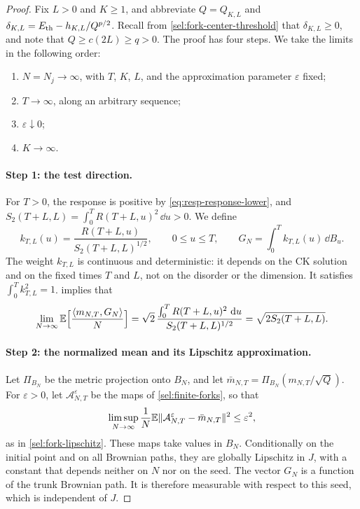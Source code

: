 \begin{proof}
Fix $L>0$ and $K\ge1$, and abbreviate $Q=Q_{K,L}$ and $\delta_{K,L}=E_{\mathrm{th}}-h_{K,L}/Q^{p/2}$. Recall from \eqref{sel:fork-center-threshold} that $\delta_{K,L}\ge0$, and note that $Q\ge c(2L)\ge q>0$. The proof has four steps. We take the limits in the following order:
\begin{enumerate}[label=(\roman*)]
\item $N=N_j\to\infty$, with $T$, $K$, $L$, and the approximation parameter $\varepsilon$ fixed;
\item $T\to\infty$, along an arbitrary sequence;
\item $\varepsilon\downarrow0$;
\item $K\to\infty$.
\end{enumerate}

\paragraph{Step 1: the test direction.}
For $T>0$, the response is positive by \eqref{eq:resp-response-lower}, and $S_2(T+L,L)=\int_0^TR(T+L,u)^2\,\dd u>0$. We define
\[
 k_{T,L}(u)=\frac{R(T+L,u)}{S_2(T+L,L)^{1/2}},\qquad 0\le u\le T,
 \qquad G_N=\int_0^Tk_{T,L}(u)\,\dd B_u.
\]
The weight $k_{T,L}$ is continuous and deterministic: it depends on the CK solution and on the fixed times $T$ and $L$, not on the disorder or the dimension. It satisfies $\int_0^Tk_{T,L}^2=1$.  implies that
\begin{equation}\label{eq:resp-test-overlap}
 \lim_{N\to\infty}\mathbb E\Bigl[\frac{\left\langle m_{N,T},G_N\right\rangle}N\Bigr]
 =\sqrt2\,\frac{\int_0^TR(T+L,u)^2\,\mathop{}\!\mathrm d u}{S_2(T+L,L)^{1/2}}
 =\sqrt{2S_2(T+L,L)}.
\end{equation}

\paragraph{Step 2: the normalized mean and its Lipschitz approximation.}
Let $\Pi_{B_N}$ be the metric projection onto $B_N$, and let $\bar m_{N,T}=\Pi_{B_N}(m_{N,T}/\sqrt Q)$. For $\varepsilon>0$, let $\mathcal A^\varepsilon_{N,T}$ be the maps of \cref{sel:finite-forks}, so that
\[
 \limsup_{N\to\infty}\frac1N\mathbb E\lVert\mathcal A^\varepsilon_{N,T}-\bar m_{N,T}\rVert^2\le\varepsilon^2,
\]
as in \eqref{sel:fork-lipschitz}. These maps take values in $B_N$. Conditionally on the initial point and on all Brownian paths, they are globally Lipschitz in $J$, with a constant that depends neither on $N$ nor on the seed. The vector $G_N$ is a function of the trunk Brownian path. It is therefore measurable with respect to this seed, which is independent of $J$.


\end{proof}
